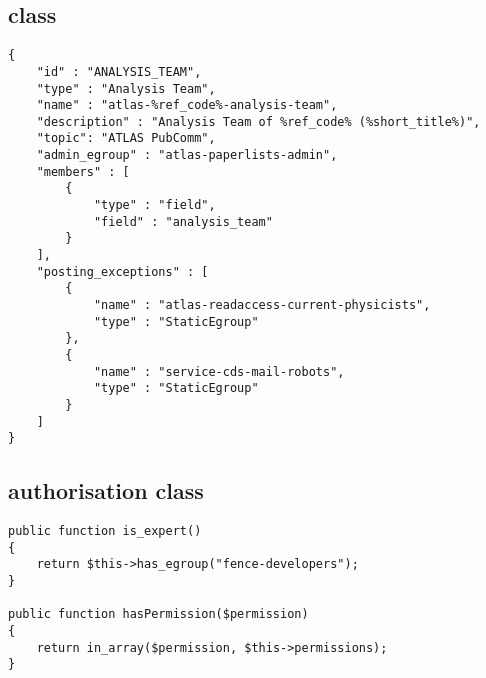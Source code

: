 \subsection{ class}%
\label{app:analysis:egroupmanager}

\begin{lstlisting}
{
    "id" : "ANALYSIS_TEAM",
    "type" : "Analysis Team",
    "name" : "atlas-%ref_code%-analysis-team",
    "description" : "Analysis Team of %ref_code% (%short_title%)",
    "topic": "ATLAS PubComm",
    "admin_egroup" : "atlas-paperlists-admin",
    "members" : [
        {
            "type" : "field",
            "field" : "analysis_team"
        }
    ],
    "posting_exceptions" : [
        {
            "name" : "atlas-readaccess-current-physicists",
            "type" : "StaticEgroup"
        },
        {
            "name" : "service-cds-mail-robots",
            "type" : "StaticEgroup"
        }
    ]
}
\end{lstlisting}


\subsection{ authorisation class}%
\label{app:analysis:userauthorise}

\begin{lstlisting}
public function is_expert()
{
    return $this->has_egroup("fence-developers");
}

public function hasPermission($permission)
{
    return in_array($permission, $this->permissions);
}
\end{lstlisting}
